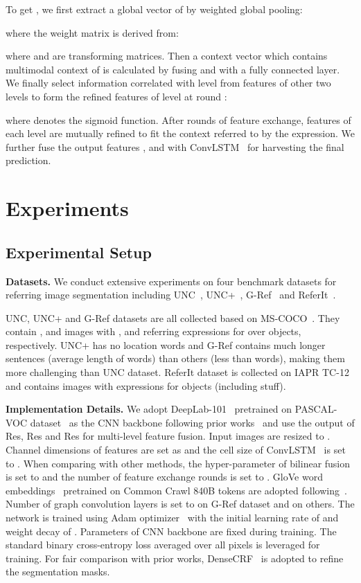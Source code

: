\documentclass[10pt,twocolumn,letterpaper]{article}
\begin{document}
To get , we first extract a global vector  
of  by weighted global pooling:

where the weight matrix  is derived from:

where  and  are transforming matrices.
Then a context vector  which contains multimodal context of  is 
calculated by fusing  and  with a fully connected layer. 
We finally select information correlated with level  from features 
of other two levels to form the refined features of level  at round :

where  denotes the sigmoid function.  
After  rounds of feature exchange, features of each level are mutually refined to 
fit the context referred to by the expression.
We further fuse the output features ,  and  with 
ConvLSTM~\cite{xingjian2015convolutional} for harvesting the final prediction.

\section{Experiments}
\subsection{Experimental Setup}
\label{sec:setup}
\textbf{Datasets. }We conduct extensive experiments on four benchmark datasets for referring image segmentation including UNC~\cite{yu2016modeling}, UNC+~\cite{yu2016modeling}, G-Ref~\cite{mao2016generation} and ReferIt~\cite{kazemzadeh2014referitgame}.

UNC, UNC+ and G-Ref datasets are all collected based on MS-COCO~\cite{lin2014microsoft}. They contain 
,  and  images with ,  and  referring expressions 
for over  objects, respectively. UNC+ has no location words and G-Ref contains much longer 
sentences (average length of  words) than others (less than  words), making them more challenging 
than UNC dataset. ReferIt dataset is collected on IAPR TC-12~\cite{escalante2010segmented} and contains 
 images with  expressions for  objects (including stuff).

\textbf{Implementation Details. }We adopt DeepLab-101~\cite{chen2017deeplab} pretrained on PASCAL-VOC 
dataset~\cite{everingham2010pascal} as the CNN backbone following prior works~\cite{ye2019cross}\cite{li2018referring} 
and use the output of Res, Res and Res for multi-level feature fusion. 
Input images are resized to .
Channel dimensions of features are set as  and the cell size of ConvLSTM~\cite{xingjian2015convolutional} is set to .
When comparing with other methods, the hyper-parameter  of bilinear fusion is set to  and the 
number of feature exchange rounds  is set to . GloVe word embeddings~\cite{pennington2014glove} 
pretrained on Common Crawl 840B tokens are adopted following~\cite{chen2019see}. 
Number of graph convolution layers is set to  on G-Ref dataset and  on others.
The network is trained using Adam optimizer~\cite{kingma2014adam} with the initial learning rate of  and weight decay of . 
Parameters of CNN backbone are fixed during training. 
The standard binary cross-entropy loss averaged over all pixels is leveraged for training. 
For fair comparison with prior works, DenseCRF~\cite{krahenbuhl2011efficient} is adopted to refine the segmentation masks.
\end{document}

